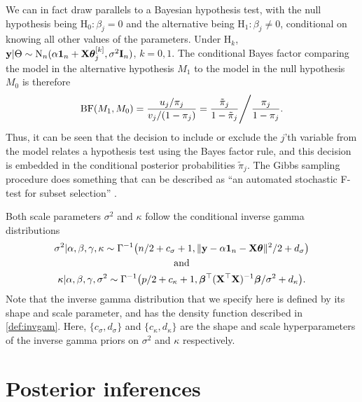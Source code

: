 \documentclass[showframe,11pt,twoside,openright]{report}
\begin{document}
We can in fact draw parallels to a Bayesian hypothesis test, with the null hypothesis being $\text{H}_0: \beta_j = 0$ and the alternative being $\text{H}_1: \beta_j \neq 0$, conditional on knowing all other values of the parameters.
Under $\text{H}_k$, ${\mathbf y}|\Theta \sim\operatorname{N}_n(\alpha {\mathbf 1}_n + {\mathbf X}{\bm\theta}_j^{[k]}, \sigma^2{\mathbf I}_n )$, $k=0,1$. 
The conditional Bayes factor comparing the model in the alternative hypothesis $M_1$ to the model in the null hypothesis $M_0$ is therefore
\begin{align*}
  \operatorname{BF}(M_1,M_0) 
  = \frac{u_j/\pi_j}{v_j/(1-\pi_j)} 
  = \frac{\tilde \pi_j  }{1-\tilde \pi_j} \Bigg/ \frac{\pi_j}{ 1-\pi_j }.
\end{align*}
Thus, it can be seen that the decision to include or exclude the $j$'th variable from the model relates a hypothesis test using the Bayes factor rule, and this decision is embedded in the conditional posterior probabilities $\tilde \pi_j$.
The Gibbs sampling procedure does something that can be described as ``an automated stochastic F-test for subset selection'' \citep{Kuo1998}.

Both scale parameters $\sigma^2$ and $\kappa$ follow the conditional inverse gamma distributions
\begin{align*}
  \begin{gathered}
    \sigma^2|\alpha,\beta,\gamma,\kappa \sim \Gamma^{-1}\big(n/2+c_\sigma+1, \Vert {\mathbf y}-\alpha{\mathbf 1}_n-{\mathbf X}{\bm\theta} \Vert^2/2 + d_\sigma \big) \\
    \text{and} \\
    \kappa|\alpha,\beta,\gamma,\sigma^2 \sim \Gamma^{-1}\big(p/2+c_\kappa+1, {\bm\beta}^\top(\mathbf X^\top \mathbf X)^{-1}{\bm\beta}/\sigma^2 + d_\kappa \big). \\
  \end{gathered}
\end{align*}
Note that the inverse gamma distribution that we specify here is defined by its shape and scale parameter, and has the density function described in \cref{def:invgam}.
Here, $\{c_\sigma, d_\sigma\}$ and $\{c_\kappa, d_\kappa\}$ are the shape and scale hyperparameters of the inverse gamma priors on $\sigma^2$ and $\kappa$ respectively.


\section{Posterior inferences}
\end{document}
